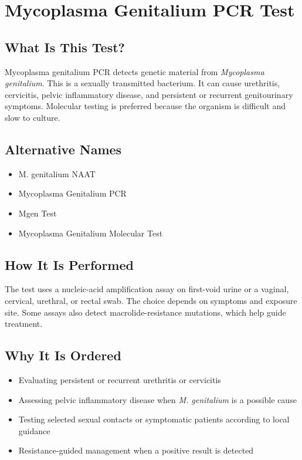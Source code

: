 \chapter{Mycoplasma Genitalium PCR Test}

\section*{What Is This Test?}
Mycoplasma genitalium PCR detects genetic material from \textit{Mycoplasma genitalium}. This is a sexually transmitted bacterium. It can cause urethritis, cervicitis, pelvic inflammatory disease, and persistent or recurrent genitourinary symptoms. Molecular testing is preferred because the organism is difficult and slow to culture.

\section*{Alternative Names}
\begin{itemize}
  \item M. genitalium NAAT
  \item Mycoplasma Genitalium PCR
  \item Mgen Test
  \item Mycoplasma Genitalium Molecular Test
\end{itemize}
\section*{How It Is Performed}
The test uses a nucleic-acid amplification assay on first-void urine or a vaginal, cervical, urethral, or rectal swab. The choice depends on symptoms and exposure site. Some assays also detect macrolide-resistance mutations, which help guide treatment.

\section*{Why It Is Ordered}
\begin{itemize}
  \item Evaluating persistent or recurrent urethritis or cervicitis
  \item Assessing pelvic inflammatory disease when \textit{M. genitalium} is a possible cause
  \item Testing selected sexual contacts or symptomatic patients according to local guidance
  \item Resistance-guided management when a positive result is detected
\end{itemize}

